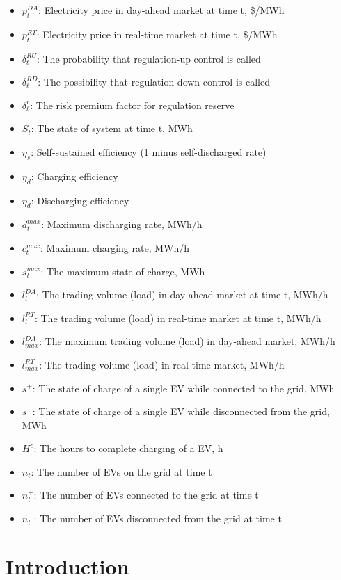 \documentclass[a4paper,11pt,twoside,onecolumn]{book}
\begin{document}
\begin{itemize}
	\item $p_t^{DA}$: Electricity price in day-ahead market at time t, \$/MWh
	\item $p_t^{RT}$: Electricity price in real-time market at time t, \$/MWh
	\item $\delta_t^{RU}$: The probability that regulation-up control is called
	\item $\delta_t^{RD}$: The possibility that regulation-down control is called
	\item $\delta_t^r$: The risk premium factor for regulation reserve
	\item $S_t$: The state of system at time t, MWh
	\item $\eta_s$: Self-sustained efficiency (1 minus self-discharged rate)
	\item $\eta_d$: Charging efficiency
	\item $\eta_d$: Discharging efficiency
	\item $d_t^{max}$: Maximum discharging rate, MWh/h
	\item $c_t^{max}$: Maximum charging rate, MWh/h
	\item $s_t^{max}$: The maximum state of charge, MWh
	\item $l_t^{DA}$: The trading volume (load) in day-ahead market at time t, MWh/h
	\item $l_t^{RT}$: The trading volume (load) in real-time market at time t, MWh/h
	\item $l_{max}^{DA}$: The maximum trading volume (load) in day-ahead market, MWh/h
	\item $l_{max}^{RT}$: The trading volume (load) in real-time market, MWh/h
	\item $s^+$: The state of charge of a single EV while connected to the grid, MWh
	\item $s^-$: The state of charge of a single EV while disconnected from the grid, MWh
	\item $H^c$: The hours to complete charging of a EV, h
	\item $n_t$: The number of EVs on the grid at time t
	\item $n_t^+$: The number of EVs connected to the grid at time t
	\item $n_t^-$: The number of EVs disconnected from the grid at time t
	
\end{itemize}




\mainmatter

\chapter{Introduction}
%
\end{document}
